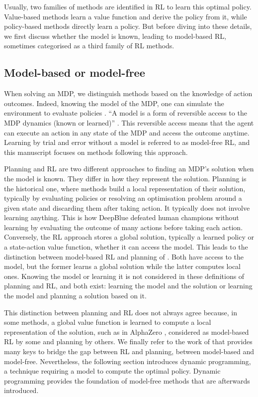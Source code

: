 Usually, two families of methods are identified in RL to learn this optimal policy.
Value-based methods learn a value function and derive the policy from it, while policy-based methods directly learn a policy.
But before diving into these details, we first discuss whether the model is known, leading to model-based RL, sometimes categorised as a third family of RL methods.

\subsection{Model-based or model-free}
\label{sec:ch2_model_based_vs_model_free}

When solving an MDP, we distinguish methods based on the knowledge of action outcomes.
Indeed, knowing the model of the MDP, one can simulate the environment to evaluate policies \citep{sutton2018reinforcement}.
``A model is a form of reversible access to the MDP dynamics (known or learned)'' \citep{moerland2023model}.
This reversible access means that the agent can execute an action in any state of the MDP and access the outcome anytime.
Learning by trial and error without a model is referred to as model-free RL, and this manuscript focuses on methods following this approach.

Planning and RL are two different approaches to finding an MDP's solution when the model is known.
They differ in how they represent the solution.
Planning is the historical one, where methods build a local representation of their solution, typically by evaluating policies or resolving an optimisation problem around a given state and discarding them after taking action.
It typically does not involve learning anything.
This is how DeepBlue \citep{campbell2002deep} defeated human champions without learning by evaluating the outcome of many actions before taking each action.
Conversely, the RL approach stores a global solution, typically a learned policy or a state-action value function, whether it can access the model.
This leads to the distinction between model-based RL and planning of \cite{moerland2023model}.
Both have access to the model, but the former learns a global solution while the latter computes local ones.
Knowing the model or learning it is not considered in these definitions of planning and RL, and both exist: learning the model and the solution or learning the model and planning a solution based on it.

This distinction between planning and RL does not always agree because, in some methods, a global value function is learned to compute a local representation of the solution, such as in AlphaZero \citep{silver2018general}, considered as model-based RL by some and planning by others.
We finally refer to the work of \cite{moerland2023model} that provides many keys to bridge the gap between RL and planning, between model-based and model-free.
Nevertheless, the following section introduces dynamic programming, a technique requiring a model to compute the optimal policy.
Dynamic programming provides the foundation of model-free methods that are afterwards introduced.

